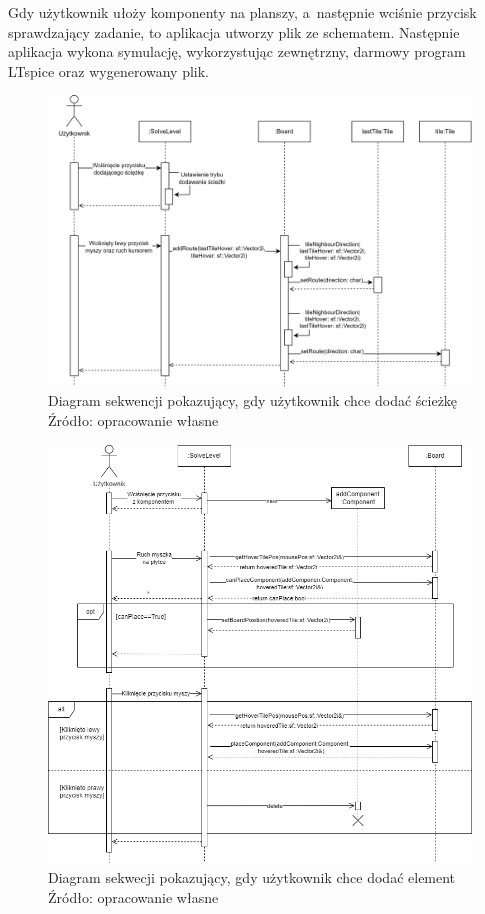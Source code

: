 \documentclass[12pt, a4paper]{article} %
\begin{document}
\aka Gdy użytkownik ułoży komponenty na planszy, a~następnie wciśnie przycisk sprawdzający zadanie, to aplikacja utworzy plik ze schematem. Następnie aplikacja wykona symulację, wykorzystując zewnętrzny, darmowy program LTspice oraz wygenerowany plik.

\begin{figure}[h]
	\centering
	\includegraphics[width=15cm]{images/plan-diagram_sekwencji_add_route.png}
	\caption{Diagram sekwencji pokazujący, gdy użytkownik chce dodać ścieżkę \\ Źródło: opracowanie własne}
	\label{rys:route}
\end{figure}

\begin{figure}[h]
	\centering
	\includegraphics[width=15cm]{images/sequence_add_component.png}
	\caption{Diagram sekwecji pokazujący, gdy użytkownik chce dodać element \\ Źródło: opracowanie własne}
	\label{rys:sequence_add_component}
\end{figure}
\end{document}
